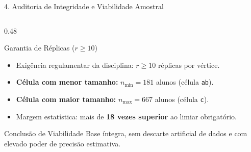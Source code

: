 \documentclass[aspectratio=169, 10pt]{beamer}
\begin{document}
\begin{frame}{4. Auditoria de Integridade e Viabilidade Amostral}
\begin{columns}[T]
        \begin{column}{0.48\textwidth}
            \begin{block}{Garantia de Réplicas ($r \ge 10$)}
                \begin{itemize}\setlength{\itemsep}{5pt}
                    \item Exigência regulamentar da disciplina: $r \ge 10$ réplicas por vértice.
                    \item \textbf{Célula com menor tamanho:} $n_{\min} = 181$ alunos (célula \texttt{ab}).
                    \item \textbf{Célula com maior tamanho:} $n_{\max} = 667$ alunos (célula \texttt{c}).
                    \item Margem estatística: mais de \textbf{18 vezes superior} ao limiar obrigatório.
                \end{itemize}
            \end{block}

            \begin{exampleblock}{Conclusão de Viabilidade}
                Base íntegra, sem descarte artificial de dados e com elevado poder de precisão estimativa.
            \end{exampleblock}
        \end{column}
    \end{columns}
\end{frame}
\end{document}
